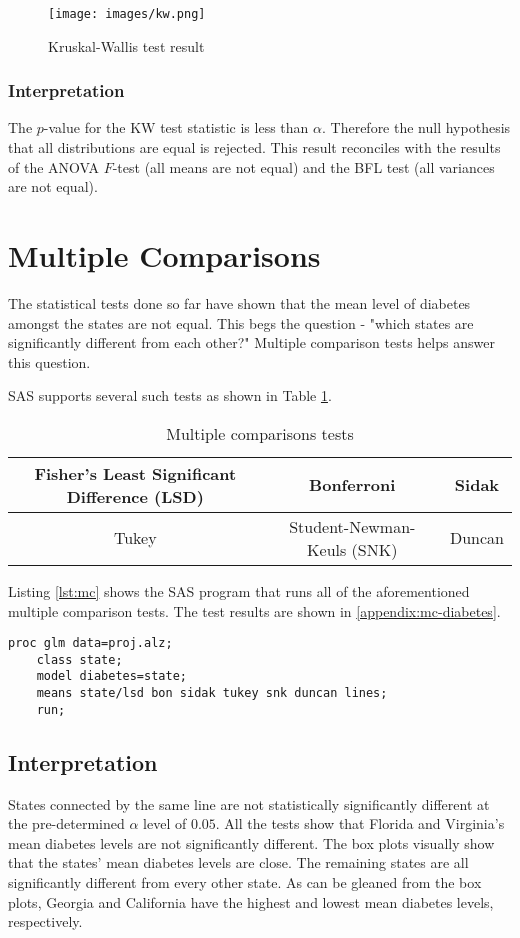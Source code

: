 \documentclass{article}
\begin{document}
\begin{figure}[ht]
    \centering
    \texttt{[image: images/kw.png]}
    \caption{Kruskal-Wallis test result}
    \label{fig:kw}
\end{figure}

\subsubsection{Interpretation}
The $p$-value for the KW test statistic is less than $\alpha$. Therefore the null hypothesis that all distributions are equal is rejected. This result reconciles with the results of the ANOVA $F$-test (all means are not equal) and the BFL test (all variances are not equal).

\section{Multiple Comparisons}
The statistical tests done so far have shown that the mean level of diabetes amongst the states are not equal. This begs the question - "which states are significantly different from each other?" Multiple comparison tests helps answer this question. 

SAS supports several such tests as shown in Table \ref{tab:mc-tests}.

\begin{table}[ht]
    \centering
    \begin{tabular}{|c|c|c|}
    \hline
        Fisher's Least Significant Difference (LSD) & Bonferroni & Sidak \\
        \hline
         Tukey & Student-Newman-Keuls (SNK) & Duncan \\
         \hline
    \end{tabular}
    \caption{Multiple comparisons tests}
    \label{tab:mc-tests}
\end{table}

Listing \ref{lst:mc} shows the SAS program that runs all of the aforementioned multiple comparison tests. The test results are shown in \ref{appendix:mc-diabetes}.

\begin{lstlisting}[language=SAS,caption=Multiple comparison tests SAS progam,captionpos=b,label=lst:mc]
    proc glm data=proj.alz;
    class state;
    model diabetes=state;
    means state/lsd bon sidak tukey snk duncan lines;
    run;
\end{lstlisting}


\subsection{Interpretation}
States connected by the same line are not statistically significantly different at the pre-determined $\alpha$ level of $0.05$. All the tests show that Florida and Virginia's mean diabetes levels are not significantly different. The box plots visually show that the states' mean diabetes levels are close. The remaining states are all significantly different from every other state. As can be gleaned from the box plots, Georgia and California have the highest and lowest mean diabetes levels, respectively. 
\end{document}

